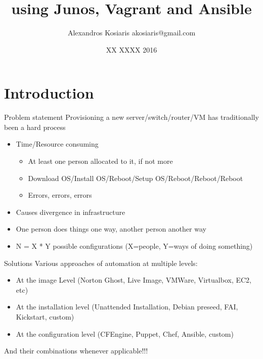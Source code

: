 \documentclass{beamer}
\title[Provisioning Virtual Networks]{using Junos, Vagrant and Αnsible}
\author{Alexandros Kosiaris akosiaris@gmail.com}
\institute{GRNOG - X Technical Meeting}
\date{XX XXXX 2016}
\begin{document}

\begin{frame}
    \titlepage
\end{frame}

\section{Introduction}

    \begin{frame}{Problem statement}
        Provisioning a new server/switch/router/VM has traditionally been a hard process

        \begin{itemize}
            \pause \item Time/Resource consuming
            \begin{itemize}
                \pause \item At least one person allocated to it, if not more
                \pause \item Download OS/Install OS/Reboot/Setup OS/Reboot/Reboot/Reboot
                \pause \item Errors, errors, errors
            \end{itemize}
            \pause \item Causes divergence in infrastructure
                \pause \item One person does things one way, another person another way
		\pause \item N = X * Y possible configurations (X=people, Y=ways of doing something)
        \end{itemize}

    \end{frame}

    \begin{frame}{Solutions}
	Various approaches of automation at multiple levels:
        \begin{itemize}
	    \pause \item At the image Level (Norton Ghost, Live Image, VMWare, Virtualbox, EC2, etc)
	    \pause \item At the installation level (Unattended Installation, Debian preseed, FAI, Kickstart, custom)
	    \pause \item At the configuration level (CFEngine, Puppet, Chef, Ansible, custom)
        \end{itemize}

        \pause And their combinations whenever applicable!!!

    \end{frame}
\end{document}
